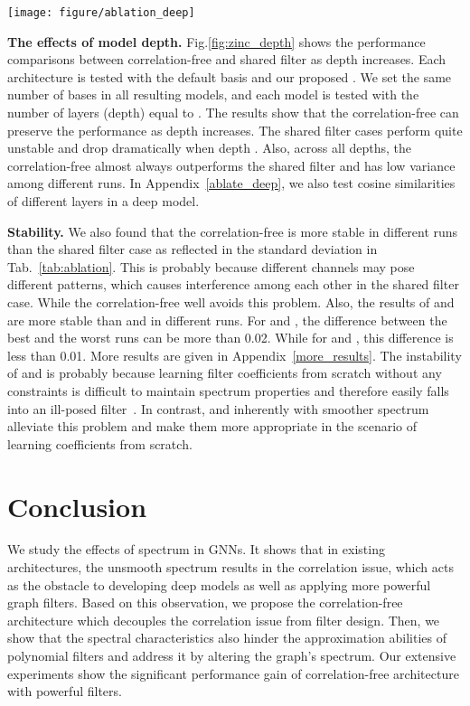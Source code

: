 \documentclass[nohyperref]{article}
\theoremstyle{plain}
\theoremstyle{definition}
\theoremstyle{remark}
\begin{document}
\begin{figure*}[h]
	\centering
	\texttt{[image: figure/ablation\_deep]}
	\vspace{-10pt}
	\caption{Ablation study results on ZINC with different number of layers.}
	\label{fig:zinc_depth}
	\vspace{-10pt}
\end{figure*}

\textbf{The effects of model depth.}
Fig.\ref{fig:zinc_depth} shows the performance comparisons between correlation-free and shared filter as depth increases.
Each architecture is tested with the default basis  and our proposed .
We set the same number of bases in all resulting models, and each model is tested with the number of layers (depth) equal to .
The results show that the correlation-free can preserve the performance as depth increases.
The shared filter cases perform quite unstable and drop dramatically when depth . Also, across all depths, the correlation-free almost always outperforms the shared filter and has low variance among different runs.
In Appendix~\ref{ablate_deep}, we also test cosine similarities of different layers in a deep model.

\textbf{Stability.}
We also found that the correlation-free is more stable in different runs than the shared filter case as reflected in the standard deviation in Tab.~\ref{tab:ablation}.
This is probably because different channels may pose different patterns, which causes interference among each other in the shared filter case. While the correlation-free well avoids this problem.
Also, the results of  and  are more stable than  and  in different runs.
For  and , the difference between the best and the worst runs can be more than 0.02.
While for  and , this difference is less than 0.01.
More results are given in Appendix~\ref{more_results}.
The instability of  and  is probably because learning filter coefficients from scratch without any constraints is difficult to maintain spectrum properties and therefore easily falls into an ill-posed filter~\cite{he2021bernnet}.
In contrast,  and  inherently with smoother spectrum alleviate this problem and make them more appropriate in the scenario of learning coefficients from scratch.


\section{Conclusion}

We study the effects of spectrum in GNNs. It shows that in existing architectures, the unsmooth spectrum results in the correlation issue, which acts as the obstacle to developing deep models as well as applying more powerful graph filters. Based on this observation, we propose the correlation-free architecture which decouples the correlation issue from filter design. Then, we show that the spectral characteristics also hinder the approximation abilities of polynomial filters and address it by altering the graph's spectrum.
Our extensive experiments show the significant performance gain of correlation-free architecture with powerful filters.
\end{document}
